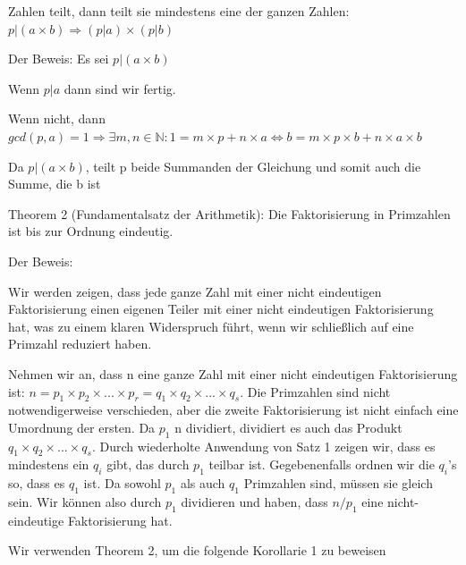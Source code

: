 \documentclass[a4paper]{article}
\begin{document}
\begin{multicols}{3}
\begin{itemize*}
            Zahlen teilt, dann teilt sie mindestens eine der ganzen Zahlen:
            $p|(a\times b)\Rightarrow (p| a)\times(p| b)$
            \begin{itemize*}
                  \item Der Beweis: Es sei $p|(a\times b)$
                  \begin{itemize*}
                        \item Wenn $p| a$ dann sind wir fertig.
                        \item Wenn nicht, dann $gcd(p,a) = 1 \Rightarrow\exists m, n\in\mathbb{N}:1=m\times p+n\times a \Leftrightarrow b=m\times p \times b + n \times a \times b$
                        \item Da $p|(a\times b)$, teilt p beide Summanden der Gleichung und somit auch die Summe, die b ist
                  \end{itemize*}
            \end{itemize*}
            \item Theorem 2 (Fundamentalsatz der Arithmetik): Die Faktorisierung in Primzahlen ist bis zur Ordnung eindeutig.
            \begin{itemize*}
                  \item Der Beweis:
                  \begin{itemize*}
                        \item Wir werden zeigen, dass jede ganze Zahl mit einer nicht eindeutigen Faktorisierung einen eigenen Teiler mit einer nicht eindeutigen Faktorisierung hat, was zu einem klaren Widerspruch führt, wenn wir schließlich auf eine Primzahl reduziert haben.
                        \item Nehmen wir an, dass n eine ganze Zahl mit einer nicht eindeutigen Faktorisierung ist: $n=p_1\times p_2\times ...\times p_r=q_1 \times q_2\times ... \times q_s$. Die Primzahlen sind nicht notwendigerweise verschieden, aber die zweite Faktorisierung ist nicht einfach eine Umordnung der ersten. Da $p_1$ n dividiert, dividiert es auch das Produkt $q_1\times q_2\times ... \times q_s$. Durch wiederholte Anwendung von Satz 1 zeigen wir, dass es mindestens ein $q_i$ gibt, das durch $p_1$ teilbar ist. Gegebenenfalls ordnen wir die $q_i$'s so, dass es $q_1$ ist. Da sowohl $p_1$ als auch $q_1$ Primzahlen sind, müssen sie gleich sein. Wir können also durch $p_1$ dividieren und haben, dass $n/p_1$ eine nicht-eindeutige Faktorisierung hat.
                  \end{itemize*}
                  \item Wir verwenden Theorem 2, um die folgende Korollarie 1 zu beweisen

\end{itemize*}
\end{itemize*}
\end{multicols}
\end{document}

